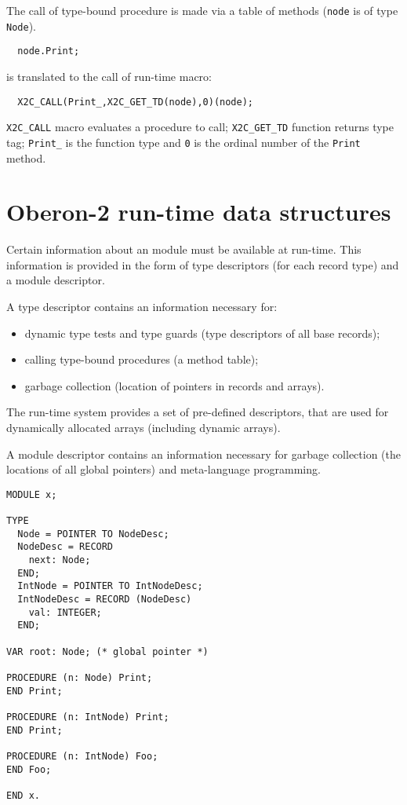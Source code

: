 The call of type-bound procedure is made via a table of methods
({\tt node} is of type {\tt Node}).
\begin{verbatim}
  node.Print;
\end{verbatim}
is translated to the call of run-time macro:
\begin{verbatim}
  X2C_CALL(Print_,X2C_GET_TD(node),0)(node);
\end{verbatim}
\verb+X2C_CALL+ macro evaluates a procedure to call;
\verb+X2C_GET_TD+ function returns type tag;
\verb+Print_+ is the function type and {\tt 0} is the ordinal number
of the {\tt Print} method.

\section{Oberon-2 run-time data structures}\label{maptoc:runtimedata}

Certain  information  about an \ot{}  module must be available at
run-time.  This  information  is  provided  in  the  form of type
descriptors (for each record type) and a module descriptor.

A type descriptor contains an information necessary for:
\begin{itemize}
\item dynamic type tests and type guards (type descriptors
        of all base records);
\item calling type-bound procedures (a method table);
\item garbage collection (location of pointers in records and arrays).
\end{itemize}

The  run-time  system  provides a set of pre-defined descriptors,
that are used for dynamically allocated arrays (including dynamic
arrays).

A module descriptor contains an information necessary for garbage
collection (the locations of all global pointers)  and
meta-language programming.

\Example
\begin{verbatim}
MODULE x;

TYPE
  Node = POINTER TO NodeDesc;
  NodeDesc = RECORD
    next: Node;
  END;
  IntNode = POINTER TO IntNodeDesc;
  IntNodeDesc = RECORD (NodeDesc)
    val: INTEGER;
  END;

VAR root: Node; (* global pointer *)

PROCEDURE (n: Node) Print;
END Print;

PROCEDURE (n: IntNode) Print;
END Print;

PROCEDURE (n: IntNode) Foo;
END Foo;

END x.
\end{verbatim}

